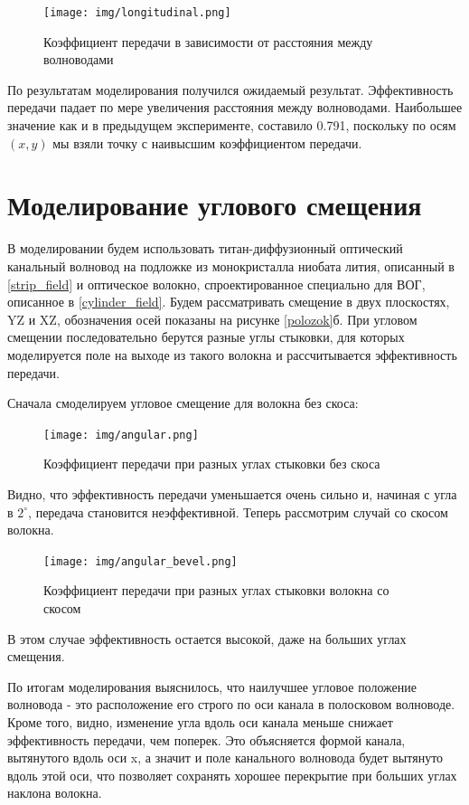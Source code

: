 \begin{figure}[h!]
	\texttt{[image: img/longitudinal.png]}
	\caption{Коэффициент передачи в зависимости от расстояния между волноводами}
	\label{longitudinal}
\end{figure}

По результатам моделирования получился ожидаемый результат. Эффективность передачи падает по мере увеличения расстояния между волноводами. Наибольшее значение как и в предыдущем эксперименте, составило 0.791, поскольку по осям $(x,y)$ мы взяли точку с наивысшим коэффициентом передачи.   

\section{Моделирование углового смещения}

В моделировании будем использовать титан-диффузионный оптический канальный волновод на подложке из монокристалла ниобата лития, описанный в \ref{strip_field} и оптическое волокно, спроектированное специально для ВОГ, описанное в \ref{cylinder_field}. Будем рассматривать смещение в двух плоскостях, YZ и XZ, обозначения осей показаны на рисунке \ref{polozok}б. При угловом смещении последовательно берутся разные углы стыковки, для которых моделируется поле на выходе из такого волокна и рассчитывается эффективность передачи. 

Сначала смоделируем угловое смещение для волокна без скоса:

\begin{figure}[h!]
	\texttt{[image: img/angular.png]}
	\caption{Коэффициент передачи при разных углах стыковки без скоса}
	\label{angular}
\end{figure}
Видно, что эффективность передачи уменьшается очень сильно и, начиная с угла в $2^\circ$, передача становится неэффективной. Теперь рассмотрим случай со скосом волокна.

\begin{figure}[h!]
	\texttt{[image: img/angular\_bevel.png]}
	\caption{Коэффициент передачи при разных углах стыковки волокна со скосом}
	\label{angular_bevel}
\end{figure}
В этом случае эффективность остается высокой, даже на больших углах смещения.

По итогам моделирования выяснилось, что наилучшее угловое положение волновода - это расположение его строго по оси канала в полосковом волноводе. Кроме того, видно, изменение угла вдоль оси канала меньше снижает эффективность передачи, чем поперек. Это объясняется формой канала, вытянутого вдоль оси x, а значит и поле канального волновода будет вытянуто вдоль этой оси, что позволяет сохранять хорошее перекрытие при больших углах наклона волокна.
